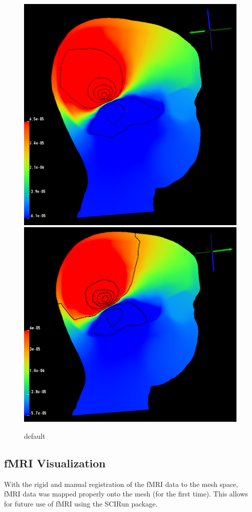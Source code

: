 \begin{figure}[H]
\begin{center}
\includegraphics[width=.49\textwidth]{Figures/iso_isolines}
\includegraphics[width=.49\textwidth]{Figures/aniso_isolines}
\caption{default}
\label{default}
\end{center}
\end{figure}

\subsection{fMRI Visualization}

With the rigid and manual registration of the fMRI data to the mesh space, fMRI data was mapped properly onto the mesh (for the first time). This allows for future use of fMRI using the SCIRun package.

